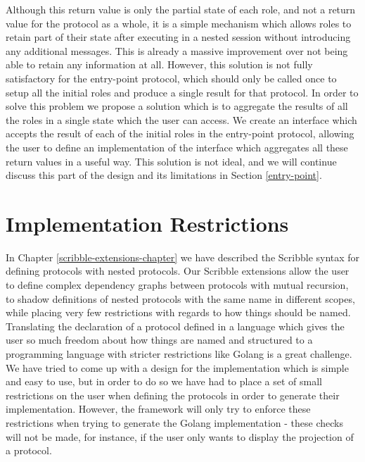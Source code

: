 \documentclass[12pt,twoside]{report}
\begin{document}
Although this return value is only the partial state of each role, and not a return value for the protocol as a whole, it is a simple mechanism which allows roles to retain part of their state after executing in a nested session without introducing any additional messages. This is already a massive improvement over not being able to retain any information at all. However, this solution is not fully satisfactory for the entry-point protocol, which should only be called once to setup all the initial roles and produce a single result for that protocol. In order to solve this problem we propose a solution which is to aggregate the results of all the roles in a single state which the user can access. We create an interface which accepts the result of each of the initial roles in the entry-point protocol, allowing the user to define an implementation of the interface which aggregates all these return values in a useful way. This solution is not ideal, and we will  continue discuss this part of the design and its limitations in Section \ref{entry-point}.

\section{Implementation Restrictions}\label{implementation-restrictions}
In Chapter \ref{scribble-extensions-chapter} we have described the Scribble syntax for defining protocols with nested protocols. Our Scribble extensions allow the user to define complex dependency graphs between protocols with mutual recursion, to shadow definitions of nested protocols with the same name in different scopes, while placing very few restrictions with regards to how things should be named.\\

Translating the declaration of a protocol defined in a language which gives the user so much freedom about how things are named and structured to a programming language with stricter restrictions like Golang is a great challenge. We have tried to come up with a design for the implementation which is simple and easy to use, but in order to do so we have had to place a set of small restrictions on the user when defining the protocols in order to generate their implementation. However, the framework will only try to enforce these restrictions when trying to generate the Golang implementation - these checks will not be made, for instance, if the user only wants to display the projection of a protocol.\\
\end{document}
